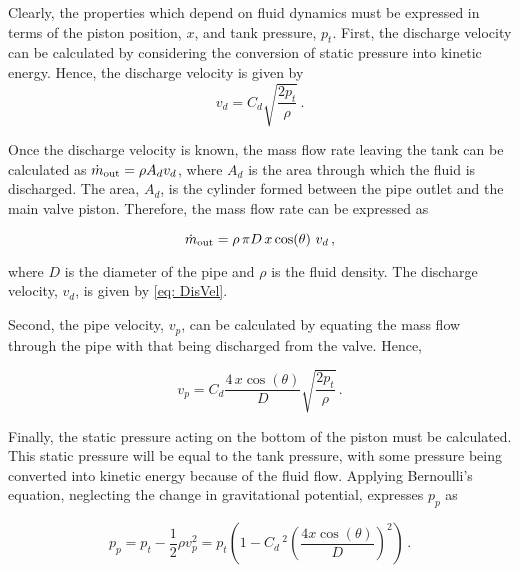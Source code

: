 Clearly, the properties which depend on fluid dynamics must be expressed in terms of the piston position, $x$, and tank pressure, $p_t$. First, the discharge velocity can be calculated by considering the conversion of static pressure into kinetic energy. Hence, the discharge velocity is given by
~
\begin{equation} \label{eq: DisVel}
    v_d = C_d \sqrt{\frac{2 p_t}{\rho}} \, .
\end{equation}

Once the discharge velocity is known, the mass flow rate leaving the tank can be calculated as $\dot{m}_{\rm{out}} = \rho A_d v_d$, where $A_d$ is the area through which the fluid is discharged. The area, $A_d$, is the cylinder formed between the pipe outlet and the main valve piston. Therefore, the mass flow rate can be expressed as

\begin{equation} \label{eq: ValveMassDischarge}
    \dot{m}_{\rm{out}} =
    \rho \, \pi D \, x \cos(\theta) \,\, v_d \, ,
\end{equation}

where $D$ is the diameter of the pipe and $\rho$ is the fluid density. The discharge velocity, $v_d$, is given by \cref{eq: DisVel}.

Second, the pipe velocity, $v_p$, can be calculated by equating the mass flow through the pipe with that being discharged from the valve. Hence,

\begin{equation*}
    v_p = C_d \frac{4 \, x \cos(\theta)}{D} \sqrt{\frac{2 p_t}{\rho}} \, .
\end{equation*}

Finally, the static pressure acting on the bottom of the piston must be calculated. This static pressure will be equal to the tank pressure, with some pressure being converted into kinetic energy because of the fluid flow. Applying Bernoulli's equation, neglecting the change in gravitational potential, expresses $p_p$ as

\begin{equation*}
    p_p = p_t - \frac{1}{2} \rho v_p ^2 =
    p_t \left( 1 - C_d \,^2 \left( \frac{4 x \cos(\theta)}{D} \right)^2 \right) \, .
\end{equation*}

